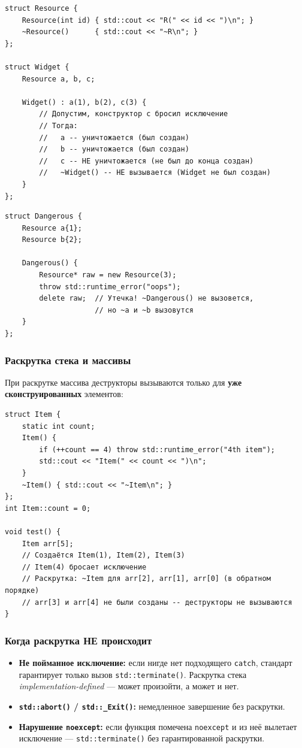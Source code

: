 \documentclass[a4paper,12pt]{article}
\begin{document}
\begin{lstlisting}
struct Resource {
    Resource(int id) { std::cout << "R(" << id << ")\n"; }
    ~Resource()      { std::cout << "~R\n"; }
};

struct Widget {
    Resource a, b, c;

    Widget() : a(1), b(2), c(3) {
        // Допустим, конструктор c бросил исключение
        // Тогда:
        //   a -- уничтожается (был создан)
        //   b -- уничтожается (был создан)
        //   c -- НЕ уничтожается (не был до конца создан)
        //   ~Widget() -- НЕ вызывается (Widget не был создан)
    }
};
\end{lstlisting}

\begin{lstlisting}
struct Dangerous {
    Resource a{1};
    Resource b{2};

    Dangerous() {
        Resource* raw = new Resource(3);
        throw std::runtime_error("oops");
        delete raw;  // Утечка! ~Dangerous() не вызовется,
                     // но ~a и ~b вызовутся
    }
};
\end{lstlisting}

\subsubsection{Раскрутка стека и массивы}

При раскрутке массива деструкторы вызываются только для
\textbf{уже сконструированных} элементов:

\begin{lstlisting}
struct Item {
    static int count;
    Item() {
        if (++count == 4) throw std::runtime_error("4th item");
        std::cout << "Item(" << count << ")\n";
    }
    ~Item() { std::cout << "~Item\n"; }
};
int Item::count = 0;

void test() {
    Item arr[5];
    // Создаётся Item(1), Item(2), Item(3)
    // Item(4) бросает исключение
    // Раскрутка: ~Item для arr[2], arr[1], arr[0] (в обратном порядке)
    // arr[3] и arr[4] не были созданы -- деструкторы не вызываются
}
\end{lstlisting}

\subsubsection{Когда раскрутка НЕ происходит}

\begin{itemize}
    \item \textbf{Не пойманное исключение:} если нигде нет подходящего
          \texttt{catch}, стандарт гарантирует только вызов
          \texttt{std::terminate()}. Раскрутка стека
          \textit{implementation-defined} --- может произойти, а может и нет.
    \item \textbf{\texttt{std::abort()} / \texttt{std::\_Exit()}:} немедленное
          завершение без раскрутки.
    \item \textbf{Нарушение \texttt{noexcept}:} если функция помечена
          \texttt{noexcept} и из неё вылетает исключение ---
          \texttt{std::terminate()} без гарантированной раскрутки.
\end{itemize}
\end{document}
